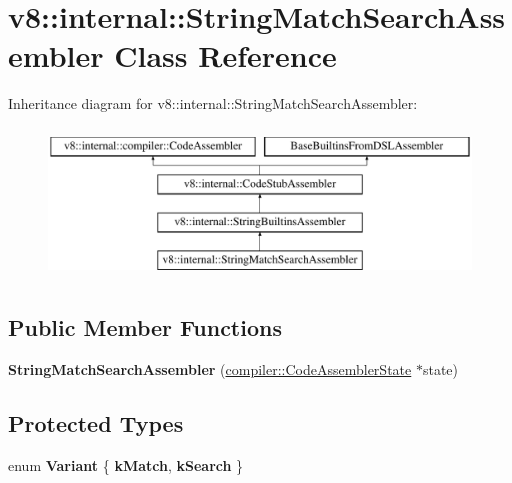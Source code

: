 \hypertarget{classv8_1_1internal_1_1StringMatchSearchAssembler}{}\section{v8\+:\+:internal\+:\+:String\+Match\+Search\+Assembler Class Reference}
\label{classv8_1_1internal_1_1StringMatchSearchAssembler}
Inheritance diagram for v8\+:\+:internal\+:\+:String\+Match\+Search\+Assembler\+:\begin{figure}[H]
\begin{center}
\leavevmode
\includegraphics[height=4.000000cm]{classv8_1_1internal_1_1StringMatchSearchAssembler}
\end{center}
\end{figure}
\subsection*{Public Member Functions}
\begin{DoxyCompactItemize}
\item 
\mbox{\label{classv8_1_1internal_1_1StringMatchSearchAssembler_a0a6ef282b867710c0639d9bbaeb717e4}} 
{\bfseries String\+Match\+Search\+Assembler} (\mbox{\hyperlink{classv8_1_1internal_1_1compiler_1_1CodeAssemblerState}{compiler\+::\+Code\+Assembler\+State}} $\ast$state)
\end{DoxyCompactItemize}
\subsection*{Protected Types}
\begin{DoxyCompactItemize}
\item 
\mbox{\label{classv8_1_1internal_1_1StringMatchSearchAssembler_a9773a9d9c90bcc47fcaa19b6c6129ea4}} 
enum {\bfseries Variant} \{ {\bfseries k\+Match}, 
{\bfseries k\+Search}
 \}
\end{DoxyCompactItemize}
